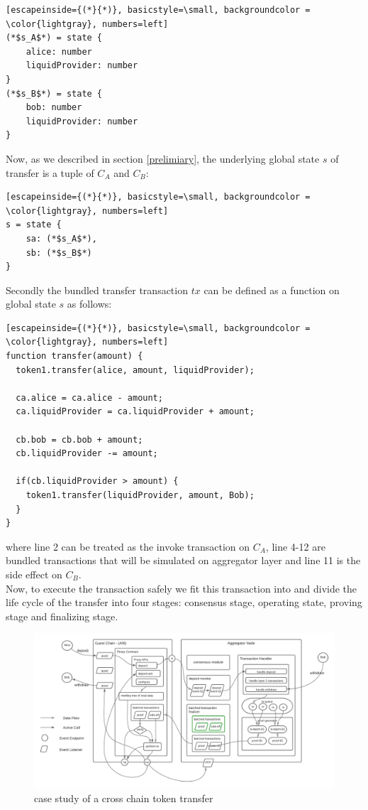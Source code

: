 \documentclass[pageno]{jpaper}
\begin{document}
\begin{lstlisting}[escapeinside={(*}{*)}, basicstyle=\small, backgroundcolor = \color{lightgray}, numbers=left]
(*$s_A$*) = state {
    alice: number
    liquidProvider: number
}
(*$s_B$*) = state {
    bob: number
    liquidProvider: number
}
\end{lstlisting}
Now, as we described in section \ref{prelimiary}, the underlying global state $s$ of transfer is a tuple of $C_A$ and $C_B$:
\begin{lstlisting}[escapeinside={(*}{*)}, basicstyle=\small, backgroundcolor = \color{lightgray}, numbers=left]
s = state {
    sa: (*$s_A$*),
    sb: (*$s_B$*)
}
\end{lstlisting}
Secondly the bundled transfer transaction $tx$ can be defined as a function on global state $s$ as follows:
\begin{lstlisting}[escapeinside={(*}{*)}, basicstyle=\small, backgroundcolor = \color{lightgray}, numbers=left]
function transfer(amount) {
  token1.transfer(alice, amount, liquidProvider);
  
  ca.alice = ca.alice - amount;
  ca.liquidProvider = ca.liquidProvider + amount;
  
  cb.bob = cb.bob + amount;
  cb.liquidProvider -= amount;
  
  if(cb.liquidProvider > amount) {
    token1.transfer(liquidProvider, amount, Bob);
  }
}
\end{lstlisting}
where line 2 can be treated as the invoke transaction on $C_A$, line 4-12 are bundled transactions that will be simulated on aggregator layer and line 11 is the side effect on $C_B$.\\
\newline
Now, to execute the transaction safely we fit this transaction into \dprotocol and divide the life cycle of the transfer into four stages: consensus stage, operating state, proving stage and finalizing stage.\\
\begin{figure}[!ht]
\caption{case study of a cross chain token transfer}
\label{case-study}
\includegraphics[scale=0.6]{case-study}
\end{figure}
\end{document}
